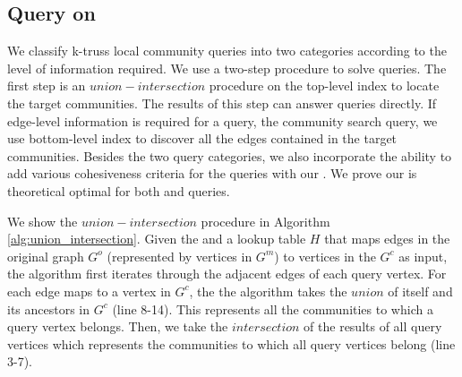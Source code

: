 \subsection{Query on \TwoLevelIndex{}}
\label{query}
We classify k-truss local community queries into two categories according to the level of information required. We use a two-step procedure to solve queries. The first step is an $union-intersection$ procedure on the top-level index to locate the target communities. The results of this step can answer \toplevelprob{} queries directly. If edge-level information is required for a query, \eg the community search query, we use bottom-level index to discover all the edges contained in the target communities. Besides the two query categories, we also incorporate the ability to add various cohesiveness criteria for the queries with our \twolevelindex{}. We prove our \twolevelindex{} is theoretical optimal for both \toplevelprob{} and \bottomlevelprob{} queries.
%
%

We show the $union-intersection$ procedure in Algorithm \ref{alg:union_intersection}. Given the \twolevelindex{} and a lookup table $H$ that maps edges in the original graph $G^o$ (represented by vertices in $G^m$) to vertices in the \treeindex{} $G^c$ as input, the algorithm first iterates through the adjacent edges of each query vertex. For each edge maps to a vertex in $G^c$, the the algorithm takes the $union$ of itself and its ancestors in $G^c$ (line 8-14). This represents all the communities to which a query vertex belongs. Then, we take the $intersection$ of the results of all query vertices which represents the communities to which all query vertices belong (line 3-7). 

